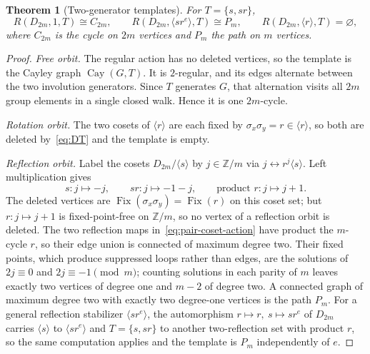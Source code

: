 \documentclass[11pt]{article}
\newtheorem{theorem}{Theorem}[section]
\theoremstyle{definition}
\theoremstyle{remark}
\newcommand{\Z}{\mathbb{Z}}
\newcommand{\Cyc}{C}
\DeclareMathOperator{\Fix}{Fix}
\DeclareMathOperator{\Cay}{Cay}
\begin{document}
\begin{theorem}[Two-generator templates]
\label{thm:pair-templates}
For $T=\{s,sr\}$,
\begin{equation}
  R(D_{2m},1,T)\cong \Cyc_{2m},\qquad
  R(D_{2m},\langle sr^e\rangle,T)\cong P_m,\qquad
  R(D_{2m},\langle r\rangle,T)=\varnothing,
  \label{eq:pair-templates}
\end{equation}
where $\Cyc_{2m}$ is the cycle on $2m$ vertices and $P_m$ the path on $m$ vertices.
\end{theorem}

\begin{proof}
\emph{Free orbit.} The regular action has no deleted vertices, so the template is the Cayley graph
$\Cay(G,T)$. It is $2$-regular, and its edges alternate between the two involution generators. Since
$T$ generates $G$, that alternation visits all $2m$ group elements in a single closed walk. Hence it
is one $2m$-cycle.

\emph{Rotation orbit.} The two cosets of $\langle r\rangle$ are each fixed by
$\sigma_x\sigma_y=r\in\langle r\rangle$, so both are deleted by~\eqref{eq:DT} and the template is
empty.

\emph{Reflection orbit.} Label the cosets $D_{2m}/\langle s\rangle$ by $j\in\Z/m$ via
$j\leftrightarrow r^j\langle s\rangle$. Left multiplication gives
\begin{equation}
  s:j\mapsto-j,\qquad sr:j\mapsto-1-j,\qquad\text{product } r:j\mapsto j+1 .
  \label{eq:pair-coset-action}
\end{equation}
The deleted vertices are $\Fix(\sigma_x\sigma_y)=\Fix(r)$ on this coset set; but $r:j\mapsto j+1$ is
fixed-point-free on $\Z/m$, so no vertex of a reflection orbit is deleted. The two reflection maps
in~\eqref{eq:pair-coset-action} have product the $m$-cycle $r$, so their edge union is connected of
maximum degree two. Their fixed points, which produce suppressed loops rather than edges, are the
solutions of $2j\equiv0$ and $2j\equiv-1\pmod m$; counting solutions in each parity of $m$ leaves
exactly two vertices of degree one and $m-2$ of degree two. A connected graph of maximum degree two
with exactly two degree-one vertices is the path $P_m$. For a general reflection stabilizer
$\langle sr^e\rangle$, the automorphism $r\mapsto r,\ s\mapsto sr^e$ of $D_{2m}$ carries
$\langle s\rangle$ to $\langle sr^e\rangle$ and $T=\{s,sr\}$ to another two-reflection set with
product $r$, so the same computation applies and the template is $P_m$ independently of $e$.
\end{proof}
\end{document}
